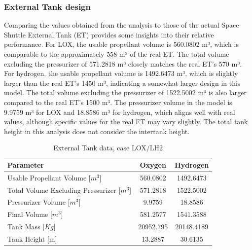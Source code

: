 \subsubsection{External Tank design}

Comparing the values obtained from the analysis to those of the actual Space Shuttle External Tank (ET) provides some insights into their relative performance. For LOX, the usable propellant volume is 560.0802 m³, which is comparable to the approximately 558 m³ of the real ET. The total volume excluding the pressurizer of 571.2818 m³ closely matches the real ET's 570 m³.
For hydrogen, the usable propellant volume is 1492.6473 m³, which is slightly larger than the real ET's 1450 m³, indicating a somewhat larger design in this model. The total volume excluding the pressurizer of 1522.5002 m³ is also larger compared to the real ET's 1500 m³.
The pressurizer volume in the model is 9.9759 m³ for LOX and 18.8586 m³ for hydrogen, which aligns well with real values, although specific values for the real ET may vary slightly.
The total tank height in this analysis does not consider the intertank height.

\begin{table}[h!]
\centering
\begin{tabular}{|l|c|c|}
\hline
\textbf{Parameter} & \textbf{Oxygen} & \textbf{Hydrogen} \\ \hline
Usable Propellant Volume [$m^3$]& 560.0802 & 1492.6473 \\ \hline
Total Volume Excluding Pressurizer [$m^3$] & 571.2818 & 1522.5002 \\ \hline
Pressurizer Volume [$m^3$] & 9.9759 & 18.8586 \\ \hline
Final Volume [$m^3$] & 581.2577 & 1541.3588 \\ \hline
Tank Mass [$Kg$] & 20952.795 & 20148.4189 \\ \hline
Tank Height [m] & 13.2887 & 30.6135 \\ \hline
\end{tabular}
\caption{External Tank data, case LOX/LH2}
\label{tab:propellant_data}
\end{table}

